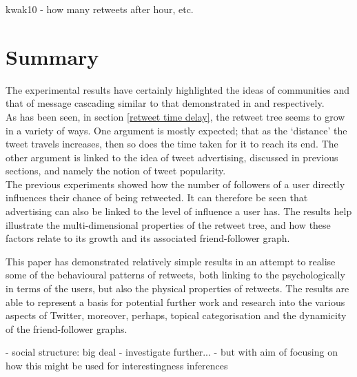 kwak10 - how many retweets after hour, etc.

\section{Summary}
The experimental results have certainly highlighted the ideas of communities and that of message cascading similar to that demonstrated in \cite{java07} and \cite{galuba10} respectively.\\
As has been seen, in section \ref{retweet time delay}, the retweet tree seems to grow in a variety of ways. One argument is mostly expected; that as the `distance' the tweet travels increases, then so does the time taken for it to reach its end. The other argument is linked to the idea of tweet advertising, discussed in previous sections, and namely the notion of tweet popularity.\\
The previous experiments showed how the number of followers of a user directly influences their chance of being retweeted. It can therefore be seen that advertising can also be linked to the level of influence a user has. The results help illustrate the multi-dimensional properties of the retweet tree, and how these factors relate to its growth and its associated friend-follower graph.

This paper has demonstrated relatively simple results in an attempt to realise some of the behavioural patterns of retweets, both linking to the psychologically in terms of the users, but also the physical properties of retweets. The results are able to represent a basis for potential further work and research into the various aspects of Twitter, moreover, perhaps, topical categorisation and the dynamicity of the friend-follower graphs.

- social structure: big deal - investigate further...
- but with aim of focusing on how this might be used for interestingness inferences


